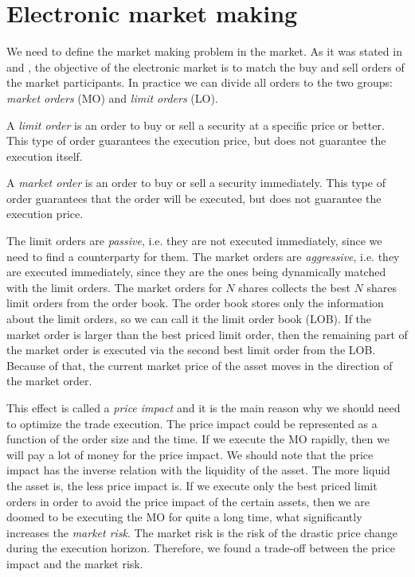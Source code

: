 \section{Electronic market making}
    We need to define the market making problem in the market. As it was stated in \cite{Cartea2015} and \cite{Bouchaud2018},
    the objective of the electronic market is to match the buy and sell orders 
    of the market participants. In practice we can divide all orders to 
    the two groups: \emph{market orders} (MO) and \emph{limit orders} (LO). 
    \begin{definition}
        A \emph{limit order} is an order to buy or sell a security at a specific price or better. This type of order guarantees the execution price, but does not guarantee the execution itself.
    \end{definition}
    \begin{definition}
        A \emph{market order} is an order to buy or sell a security immediately. This type of order guarantees that the order will be executed, but does not guarantee the execution price.
    \end{definition}
    
    The limit orders are \emph{passive}, i.e. they are not executed immediately, since 
    we need to find a counterparty for them. The market orders are \emph{aggressive},
    i.e. they are executed immediately, since they are the ones being dynamically matched with the limit orders. 
    The market orders for $N$ shares collects the best $N$ shares limit orders from the order book.
    The order book stores only the information about the limit orders, so we can call it the limit order book (LOB).
    If the market order is larger than the best priced limit order, then the remaining part of the 
    market order is executed via the second best limit order from the LOB. Because of that, the current 
    market price of the asset moves in the direction of the market order.

    This effect is called a \emph{price impact} and it is the main reason why we should need to 
    optimize the trade execution. The price impact could be represented as a function of the order size and the time.
    If we execute the MO rapidly, then we will pay a lot of money for the price impact. We should 
    note that the price impact has the inverse relation with the liquidity of the asset. The more liquid the asset is, the less price impact is.
    If we execute only the best priced limit orders in order to avoid the price impact of the certain assets, then we are 
    doomed to be executing the MO for quite a long time, what significantly increases the \emph{market risk}. The market 
    risk is the risk of the drastic price change during the execution horizon. Therefore, we found a trade-off between the 
    price impact and the market risk.
    
